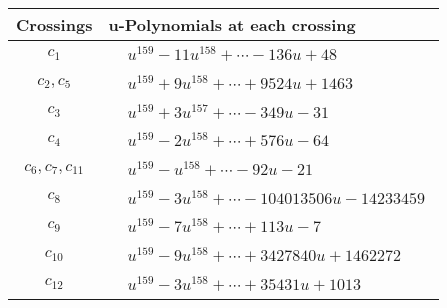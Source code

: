 \documentclass[1p]{elsarticle_modified}
\theoremstyle{definition}
\begin{document}
\begin{tabular}{m{50pt}|m{274pt}}
Crossings & \hspace{64pt}u-Polynomials at each crossing \\
\hline $$\begin{aligned}c_{1}\end{aligned}$$&$\begin{aligned}
&u^{159}-11 u^{158}+\cdots-136 u+48
\end{aligned}$\\
\hline $$\begin{aligned}c_{2},c_{5}\end{aligned}$$&$\begin{aligned}
&u^{159}+9 u^{158}+\cdots+9524 u+1463
\end{aligned}$\\
\hline $$\begin{aligned}c_{3}\end{aligned}$$&$\begin{aligned}
&u^{159}+3 u^{157}+\cdots-349 u-31
\end{aligned}$\\
\hline $$\begin{aligned}c_{4}\end{aligned}$$&$\begin{aligned}
&u^{159}-2 u^{158}+\cdots+576 u-64
\end{aligned}$\\
\hline $$\begin{aligned}c_{6},c_{7},c_{11}\end{aligned}$$&$\begin{aligned}
&u^{159}- u^{158}+\cdots-92 u-21
\end{aligned}$\\
\hline $$\begin{aligned}c_{8}\end{aligned}$$&$\begin{aligned}
&u^{159}-3 u^{158}+\cdots-104013506 u-14233459
\end{aligned}$\\
\hline $$\begin{aligned}c_{9}\end{aligned}$$&$\begin{aligned}
&u^{159}-7 u^{158}+\cdots+113 u-7
\end{aligned}$\\
\hline $$\begin{aligned}c_{10}\end{aligned}$$&$\begin{aligned}
&u^{159}-9 u^{158}+\cdots+3427840 u+1462272
\end{aligned}$\\
\hline $$\begin{aligned}c_{12}\end{aligned}$$&$\begin{aligned}
&u^{159}-3 u^{158}+\cdots+35431 u+1013
\end{aligned}$\\
\hline
\end{tabular}\\~\\
\end{document}
